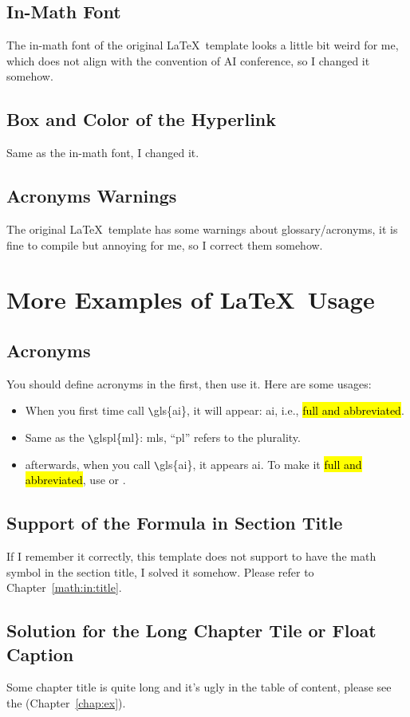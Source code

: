 \subsection{In-Math Font}
The in-math font of the original \LaTeX\ template looks a little bit weird for me, which does not align with the convention of AI conference, so I changed it somehow.

\subsection{Box and Color of the Hyperlink}
Same as the in-math font, I changed it.

\subsection{Acronyms Warnings}
The original \LaTeX\ template has some warnings about glossary/acronyms, it is fine to compile but annoying for me, so I correct them somehow.

\section{More Examples of \LaTeX\  Usage}
\subsection{Acronyms}
You should define acronyms in the  first, then use it. Here are some usages:
\begin{itemize}
    \item When you first time call \verb|\|gls\{ai\}, it will appear: \gls{ai}, i.e., \hl{full and abbreviated}.
    \item Same as the \verb|\|glspl\{ml\}: \glspl{ml}, ``pl'' refers to the plurality.
    \item afterwards, when you call \verb|\|gls\{ai\}, it appears \gls{ai}. To make it \hl{full and abbreviated}, use  or .
\end{itemize}

\subsection{Support of the Formula in Section Title}
If I remember it correctly, this template does not support to have the math symbol in the section title, I solved it somehow. Please refer to Chapter~\ref{math:in:title}.

\subsection{Solution for the Long Chapter Tile or Float Caption}
Some chapter title is quite long and it's ugly in the table of content, please see the  (Chapter~\ref{chap:ex}).